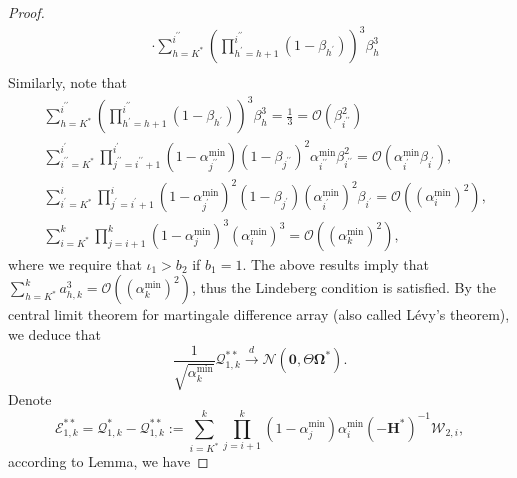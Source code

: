 \documentclass[aos]{imsart}
\numberwithin{equation}{section}
\theoremstyle{plain}
\begin{document}
\begin{appendix}
\begin{proof}
\begin{equation*}
\begin{split}
            & \cdot \sum_{h=K^{*}}^{i^{\prime \prime}}  \left( \prod_{h^{\prime}=h+1}^{i^{\prime \prime}} (1-\beta_{h^{\prime}}) \right)^3 \beta_h^3  \\
        \end{split}
    \end{equation*}
    Similarly, note that 
    \begin{equation}
        \begin{split}
            & \sum_{h=K^{*}}^{i^{\prime \prime}}  \left( \prod_{h^{\prime}=h+1}^{i^{\prime \prime}} (1-\beta_{h^{\prime}}) \right)^3 \beta_h^3 = \frac{1}{3} = \mathcal{O} \left(\beta_{i^{\prime \prime}}^{2}  \right)\\
            & \sum_{i^{\prime \prime}=K^{*}}^{i^{\prime}} \prod_{j^{\prime \prime}=i^{\prime \prime}+1}^{i^{\prime}} (1-\alpha^{\min}_{j^{\prime \prime}}) (1-\beta_{j^{\prime \prime}})^2 \alpha^{\min}_{i^{\prime \prime}} \beta_{i^{\prime \prime}}^{2} = \mathcal{O} \left( \alpha^{\min}_{i^{\prime }} \beta_{i^{\prime }} \right),\\
            & \sum_{i^{\prime}=K^{*}}^{i} \prod_{j^{\prime}=i^{\prime}+1}^{i} (1-\alpha^{\min}_{j^{\prime}})^2 (1-\beta_{j^{\prime}}) (\alpha^{\min}_{i^{\prime}})^2 \beta_{i^{\prime}} = \mathcal{O} \left(  (\alpha^{\min}_{i})^2\right),\\
            & \sum_{i=K^{*}}^{k} \prod_{j=i+1}^{k} (1-\alpha^{\min}_j)^3 (\alpha^{\min}_i)^3 = \mathcal{O} \left(  (\alpha^{\min}_{k})^2\right),
        \end{split}
    \end{equation}
    where we require that $\iota_1 > b_2$ if $b_1 = 1$. The above results imply that $\sum_{h=K^{*}}^{k} a_{h,k}^3 = \mathcal{O} \left(  (\alpha^{\min}_{k})^2\right)$, thus the Lindeberg condition is satisfied. By the  central limit theorem for martingale difference array (also called Lévy’s theorem), we deduce that 
    \begin{equation*}
        \frac{1}{\sqrt{\alpha^{\min}_k}} \mathcal{Q}_{1,k}^{**}  \stackrel{d}{\longrightarrow} \mathcal{N} \left( \bm{0}, \Theta \bm{\Omega}^{*} \right).
    \end{equation*}
    Denote  
    \begin{equation*}
        \mathcal{E}_{1,k}^{**} = \mathcal{Q}_{1,k}^{*} - \mathcal{Q}_{1,k}^{**} := \sum_{i=K^{*}}^{k} \prod_{j=i+1}^{k} (1-\alpha^{\min}_j) \alpha^{\min}_i \left(-\bm{H}^{*}\right)^{-1}   \mathcal{W}_{2,i},
    \end{equation*}
    according to Lemma, we have

\end{proof}
\end{appendix}
\end{document}
